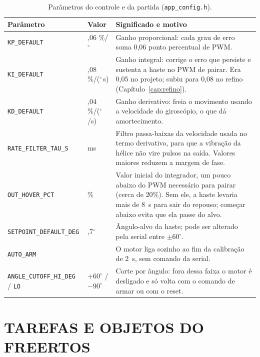\begin{table}[H]
\centering\caption{Parâmetros do controle e da partida (\texttt{app\_config.h}).}\label{tab:parametros_ctrl}
\begin{tabularx}{\textwidth}{>{\raggedright\arraybackslash}p{3.7cm}>{\raggedright\arraybackslash}p{2.3cm}X}
\hline\textbf{Parâmetro} & \textbf{Valor} & \textbf{Significado e motivo}\\\hline
\texttt{KP\_DEFAULT} & 0,06 \%/$^\circ$ & Ganho proporcional: cada grau de erro soma 0,06 ponto percentual de PWM.\\
\texttt{KI\_DEFAULT} & 0,08 \%/($^\circ$\,s) & Ganho integral: corrige o erro que persiste e sustenta a haste no PWM de pairar. Era 0,05 no projeto; subiu para 0,08 no refino (Capítulo~\ref{cap:refino}).\\
\texttt{KD\_DEFAULT} & 0,04 \%/($^\circ$/s) & Ganho derivativo: freia o movimento usando a velocidade do giroscópio, o que dá amortecimento.\\
\texttt{RATE\_FILTER\_TAU\_S} & 5 ms & Filtro passa-baixas da velocidade usada no termo derivativo, para que a vibração da hélice não vire pulsos na saída. Valores maiores reduzem a margem de fase.\\
\texttt{OUT\_HOVER\_PCT} & 16\% & Valor inicial do integrador, um pouco abaixo do PWM necessário para pairar (cerca de 20\%). Sem ele, a haste levaria mais de 8~s para sair do repouso; começar abaixo evita que ela passe do alvo.\\
\texttt{SETPOINT\_DEFAULT\_DEG} & 0,7$^\circ$ & Ângulo-alvo da haste; pode ser alterado pela serial entre $\pm60^\circ$.\\
\texttt{AUTO\_ARM} & 1 & O motor liga sozinho ao fim da calibração de 2~s, sem comando da serial.\\
\texttt{ANGLE\_CUTOFF\_HI\_DEG} / \texttt{LO} & $+60^\circ$ / $-90^\circ$ & Corte por ângulo: fora dessa faixa o motor é desligado e só volta com o comando de armar ou com o reset.\\\hline
\end{tabularx}
\end{table}

\section{TAREFAS E OBJETOS DO FREERTOS}


